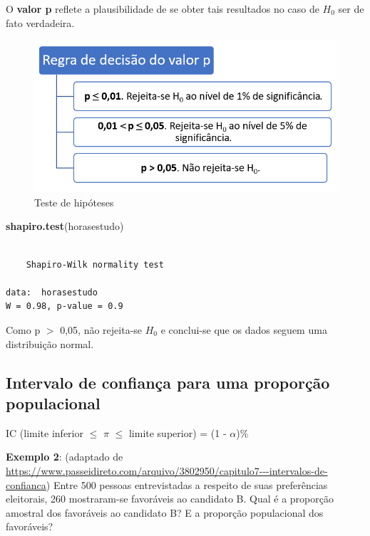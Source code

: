 \documentclass[12pt,brazil,oneside]{book}
\newenvironment{Shaded}{\begin{snugshade}}{\end{snugshade}}
\newcommand{\KeywordTok}[1]{\textcolor[rgb]{0.13,0.29,0.53}{\textbf{#1}}}
\newcommand{\NormalTok}[1]{#1}
\begin{document}
O \textbf{valor p} reflete a plausibilidade de se obter tais resultados no caso de \(H_0\) ser de fato verdadeira.

\begin{figure}[H]

{\centering \includegraphics[width=0.7\linewidth]{testehip1} 

}

\caption{Teste de hipóteses}\label{fig:testehip1}
\end{figure}

\begin{Shaded}
\begin{Highlighting}[]
\KeywordTok{shapiro.test}\NormalTok{(horasestudo)}
\end{Highlighting}
\end{Shaded}

\begin{verbatim}

    Shapiro-Wilk normality test

data:  horasestudo
W = 0.98, p-value = 0.9
\end{verbatim}

Como p \(>\) 0,05, não rejeita-se \(H_0\) e conclui-se que os dados seguem uma distribuição normal.

\hypertarget{intervalo-de-confianca-para-uma-proporcao-populacional}{%
\subsection{Intervalo de confiança para uma proporção populacional}\label{intervalo-de-confianca-para-uma-proporcao-populacional}}

IC (limite inferior \(\leq\) \(\pi\) \(\leq\) limite superior) = (1 - \(\alpha\))\%

\textbf{Exemplo 2}: (adaptado de \url{https://www.passeidireto.com/arquivo/3802950/capitulo7---intervalos-de-confianca}) Entre 500 pessoas entrevistadas a respeito de suas preferências eleitorais, 260 mostraram-se favoráveis ao candidato B. Qual é a proporção amostral dos favoráveis ao candidato B? E a proporção populacional dos favoráveis?
\end{document}
